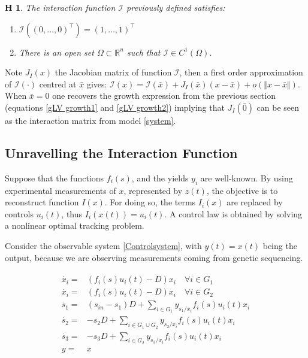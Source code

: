 \documentclass[3p,times]{article}
\newcommand{\R}{\mathbb{R}}
\newcommand{\I}{\mathcal{I}}
\newtheorem{hypo}{H}
\begin{document}
\begin{hypo}
	The interaction function $\I$ previously defined satisfies:
	\begin{enumerate}
		\item $	\I \left( (0,\dots,0)^\top \right) = (1,\dots,1)^\top $
		\item There is an open set $\Omega \subset \R^n $ such that $\I \in C^1(\Omega)$.
	\end{enumerate} 
\end{hypo}


Note $J_I(x)$ the Jacobian matrix of function $\mathcal{I}$, then a first order approximation of $\I(\cdot)$ centred at $\bar{x}$ gives: $\I(x) = \I(\bar{x}) + J_I(\bar{x})(x-\bar{x}) + o(\Vert x- \bar{x} \Vert)$. When $\bar{x}= 0$ one recovers the growth expression from the previous section (equations \eqref{gLV growth1} and \eqref{gLV growth2}) implying that $J_I(\bar{0})$ can be seen as the interaction matrix from model \eqref{system}.

\subsection{Unravelling the Interaction Function}

Suppose that the functions $f_i(s)$, and the yields $y_i$ are well-known. By using experimental measurements of $x$, represented by $z(t)$, the objective is to reconstruct function $I(x)$. For doing so, the terms $I_i(x)$ are replaced by controls $u_i(t)$, thus $I_i(x(t)) = u_i(t)$. A control law is obtained by solving a nonlinear optimal tracking problem.	

Consider the observable system \eqref{Controlsystem}, with $y(t) = x(t)$ being the output, because we are observing measurements coming from genetic sequencing.

\begin{align} 
\label{Controlsystem}
\begin{array}{cl}
\dot{x_i} =& \left(f_i(s)u_i(t) -D \right)x_i \quad \forall i \in G_1\\
\dot{x_i} =& \left(f_i(s)u_i(t) -D \right)x_i \quad \forall i \in G_2\\
\dot{s_1} =& \displaystyle (s_{in}-s_1)D + \sum\limits_{i \in G_1}y_{s_1/x_i}f_i(s)u_i(t) x_i  \\
\dot{s_2} = & \displaystyle -s_2D+\sum\limits_{i \in G_1 \cup G_2}y_{s_2/x_i}f_i(s)u_i(t)x_i  \\
\dot{s_3} =&  \displaystyle -s_3D+\sum\limits_{i \in G_2}y_{s_3/x_i}f_i(s)u_i(t) x_i \\
y  =& x
\end{array}
\end{align}	
\end{document}
